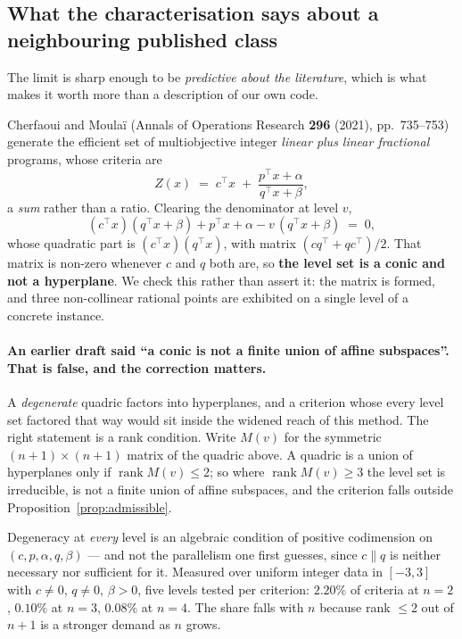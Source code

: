\documentclass[11pt,a4paper]{article}
\begin{document}
\subsection{What the characterisation says about a neighbouring published class}

The limit is sharp enough to be \emph{predictive about the literature}, which
is what makes it worth more than a description of our own code.

Cherfaoui and Moula\"i (Annals of Operations Research \textbf{296} (2021),
pp.~735--753) generate the efficient set of multiobjective integer
\emph{linear plus linear fractional} programs, whose criteria are
\[
  Z(x) \;=\; c^{\top}x \;+\; \frac{p^{\top}x + \alpha}{q^{\top}x + \beta} ,
\]
a \emph{sum} rather than a ratio.  Clearing the denominator at level $v$,
\[
  (c^{\top}x)(q^{\top}x + \beta) + p^{\top}x + \alpha
     - v\,(q^{\top}x + \beta) \;=\; 0 ,
\]
whose quadratic part is $(c^{\top}x)(q^{\top}x)$, with matrix
$(c q^{\top} + q c^{\top})/2$.  That matrix is non-zero whenever $c$ and $q$
both are, so \textbf{the level set is a conic and not a hyperplane}.  We check
this rather than assert it: the matrix is formed, and three non-collinear
rational points are exhibited on a single level of a concrete instance.

\paragraph{An earlier draft said ``a conic is not a finite union of affine
subspaces''.  That is false, and the correction matters.}
A \emph{degenerate} quadric factors into hyperplanes, and a criterion whose
every level set factored that way would sit inside the widened reach of this
method.  The right statement is a rank condition.  Write $M(v)$ for the
symmetric $(n+1) \times (n+1)$ matrix of the quadric above.  A quadric is a
union of hyperplanes only if $\operatorname{rank} M(v) \leqslant 2$; so where
$\operatorname{rank} M(v) \geqslant 3$ the level set is irreducible, is not a
finite union of affine subspaces, and the criterion falls outside
Proposition~\ref{prop:admissible}.

Degeneracy at \emph{every} level is an algebraic condition of positive
codimension on $(c, p, \alpha, q, \beta)$ --- and not the parallelism one
first guesses, since $c \parallel q$ is neither necessary nor sufficient for
it.  Measured over uniform integer data in $[-3,3]$ with $c \neq 0$,
$q \neq 0$, $\beta > 0$, five levels tested per criterion: $2.20\%$ of
criteria at $n=2$, $0.10\%$ at $n=3$, $0.08\%$ at $n=4$.  The share falls
with $n$ because rank $\leqslant 2$ out of $n+1$ is a stronger demand as $n$
grows.
\end{document}
